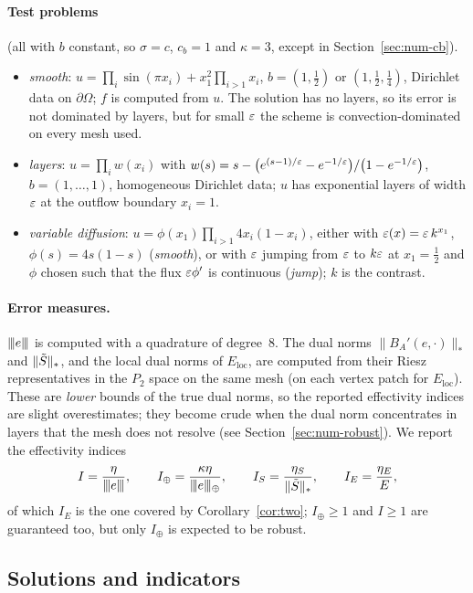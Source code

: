 \paragraph{Test problems} (all with $b$ constant, so $\sigma=c$, $c_b=1$ and $\kappa=3$, except in
Section~\ref{sec:num-cb}).
\begin{itemize}
  \item \emph{smooth}: $u=\prod_i\sin(\pi x_i)+x_1^2\prod_{i>1}x_i$, $b=(1,\tfrac12)$ or
  $(1,\tfrac12,\tfrac14)$, Dirichlet data on $\partial\Omega$; $f$ is computed from $u$. The solution
  has no layers, so its error is not dominated by layers, but for small $\varepsilon$ the scheme is
  convection-dominated on every mesh used.
  \item \emph{layers}: $u=\prod_iw(x_i)$ with
  $w(s)=s-\bigl(e^{(s-1)/\varepsilon}-e^{-1/\varepsilon}\bigr)/\bigl(1-e^{-1/\varepsilon}\bigr)$, $b=(1,\dots,1)$, homogeneous
  Dirichlet data; $u$ has exponential layers of width $\varepsilon$ at the outflow boundary $x_i=1$.
  \item \emph{variable diffusion}: $u=\phi(x_1)\prod_{i>1}4x_i(1-x_i)$, either with
  $\varepsilon(x)=\varepsilon\,k^{x_1}$, $\phi(s)=4s(1-s)$ (\emph{smooth}), or with $\varepsilon$ jumping from $\varepsilon$ to $k\varepsilon$
  at $x_1=\frac12$ and $\phi$ chosen such that the flux $\varepsilon\phi'$ is continuous (\emph{jump}); $k$ is
  the contrast.
\end{itemize}

\paragraph{Error measures.} $\lvert\kern-0.25ex\lvert\kern-0.25ex\lvert e\rvert\kern-0.25ex\rvert\kern-0.25ex\rvert$ is computed with a quadrature of degree~8. The dual norms
$\|B_A'(e,\cdot)\|_*$ and $\|\tilde S\|_*$, and the local dual norms of $E_{\mathrm{loc}}$, are computed
from their Riesz representatives in the $P_2$ space on the same mesh (on each vertex patch for
$E_{\mathrm{loc}}$). These are \emph{lower} bounds of the true dual norms, so the reported effectivity
indices are slight overestimates; they become crude when the dual norm concentrates in layers that
the mesh does not resolve (see Section~\ref{sec:num-robust}). We report the effectivity indices
\[
  I=\frac{\eta}{\lvert\kern-0.25ex\lvert\kern-0.25ex\lvert e\rvert\kern-0.25ex\rvert\kern-0.25ex\rvert},\qquad I_\oplus=\frac{\kappa\eta}{\lvert\kern-0.25ex\lvert\kern-0.25ex\lvert e\rvert\kern-0.25ex\rvert\kern-0.25ex\rvert_\oplus},\qquad
  I_S=\frac{\eta_S}{\|\tilde S\|_*},\qquad I_E=\frac{\eta_E}{E},
\]
of which $I_E$ is the one covered by Corollary~\ref{cor:two}; $I_\oplus\ge1$ and $I\ge1$ are guaranteed
too, but only $I_\oplus$ is expected to be robust.

\subsection{Solutions and indicators}

